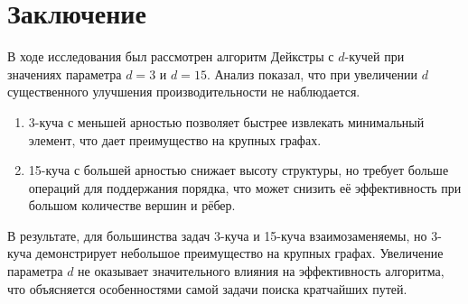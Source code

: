 \section*{Заключение}

В ходе исследования был рассмотрен алгоритм Дейкстры с \( d \)-кучей при значениях параметра \( d = 3 \) и \( d = 15 \). Анализ показал, что при увеличении \( d \) существенного улучшения производительности не наблюдается.

\begin{enumerate}
    \item 3-куча с меньшей арностью позволяет быстрее извлекать минимальный элемент, что дает преимущество на крупных графах.
    \item 15-куча с большей арностью снижает высоту структуры, но требует больше операций для поддержания порядка, что может снизить её эффективность при большом количестве вершин и рёбер.
\end{enumerate}

В результате, для большинства задач 3-куча и 15-куча взаимозаменяемы, но 3-куча демонстрирует небольшое преимущество на крупных графах. Увеличение параметра \( d \) не оказывает значительного влияния на эффективность алгоритма, что объясняется особенностями самой задачи поиска кратчайших путей.
